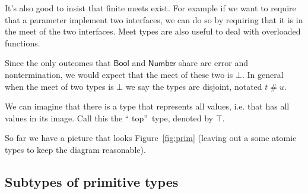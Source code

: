 \documentclass[12pt]{article}
\begin{document}
It's also good to insist that finite meets exist. For example if we want to
require that a parameter implement two interfaces, we can do so by requiring
that it is in the meet of the two interfaces. Meet types are also useful to
deal with overloaded functions.

Since the only outcomes that $\mathsf{Bool}$ and $\mathsf{Number}$ share are
error and nontermination, we would expect that the meet of these two is $%
\bot $. In general when the meet of two types is $\bot $ we say the types
are disjoint, notated $t%
\mathrel{\#}%
u$.

We can imagine that there is a type that represents all values, i.e. that
has all values in its image. Call this the \textquotedblleft
top\textquotedblright\ type, denoted by $\top $.

So far we have a picture that looks Figure~\ref{fig:prim} (leaving out a
some atomic types to keep the diagram reasonable).

\subsection{Subtypes of primitive types}
\end{document}
